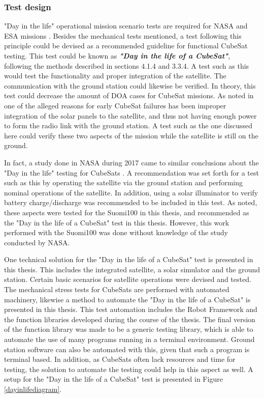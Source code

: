 \documentclass[english,12pt,a4paper,pdftex,elec,utf8]{aaltothesis}
\begin{document}
\subsubsection{Test design}
"Day in the life" operational mission scenario tests are required for NASA and ESA missions \cite{tor}. Besides the mechanical tests mentioned, a test following this principle could be devised as a recommended guideline for functional CubeSat testing. This test could be known as \textbf{\textit{"Day in the life of a CubeSat"}}, following the methods described in sections 4.1.4 and 3.3.4. A test such as this would test the functionality and proper integration of the satellite. The communication with the ground station could likewise be verified. In theory, this test could decrease the amount of DOA cases for CubeSat missions. As noted in \cite{Langer, Swart1} one of the alleged reasons for early CubeSat failures has been improper integration of the solar panels to the satellite, and thus not having enough power to form the radio link with the ground station. A test such as the one discussed here could verify these two aspects of the mission while the satellite is still on the ground.\par
In fact, a study done in NASA during 2017 came to similar conclusions about the "Day in the life" testing for CubeSats \cite{improvingcubesatsuccess}. A recommendation was set forth for a test such as this by operating the satellite via the ground station and performing nominal operations of the satellite. In addition, using a solar illuminator to verify battery charge/discharge was recommended to be included in this test. As noted, these aspects were tested for  the Suomi100 in this thesis, and recommended as the "Day in the life of a CubeSat" test in this thesis. However, this work performed with the Suomi100 was done without knowledge of the study conducted by NASA. \par  
One technical solution for the "Day in the life of a CubeSat" test is presented in this thesis. This includes the integrated satellite, a solar simulator and the ground station. Certain basic scenarios for satellite operations were devised and tested. The mechanical stress tests for CubeSats are performed with automated machinery, likewise a method to automate the "Day in the life of a CubeSat" is presented in this thesis. This test automation includes the Robot Framework and the function libraries developed during the course of the thesis. The final version of the function library was made to be a generic testing library, which is able to automate the use of many programs running in a terminal environment. Ground station software can also be automated with this, given that such a program is terminal based. In addition, as CubeSats often lack resources and time for testing, the solution to automate the testing could help in this aspect as well. A setup for the "Day in the life of a CubeSat" test is presented in Figure \ref{dayinlifediagram}.\par
\end{document}
